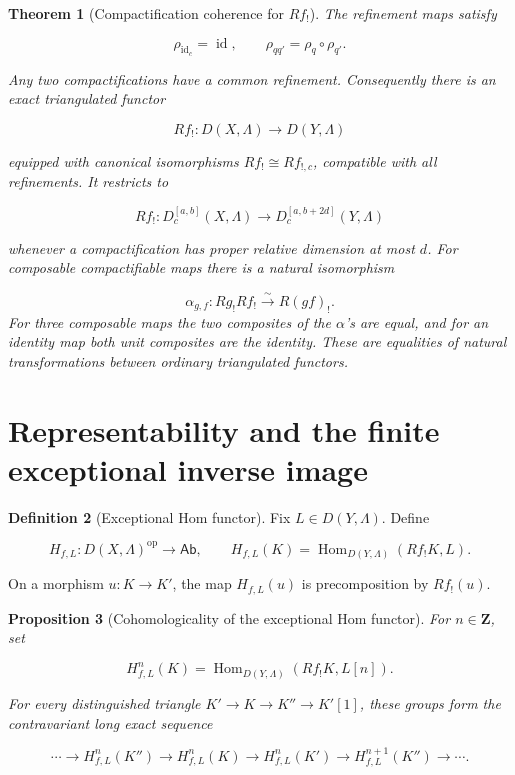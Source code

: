 \documentclass[10pt]{article}
\newtheorem{theorem}{Theorem}[section]
\newtheorem{proposition}[theorem]{Proposition}
\theoremstyle{definition}
\newtheorem{definition}[theorem]{Definition}
\newcommand{\HomD}{\operatorname{Hom}}
\begin{document}
\begin{theorem}[Compactification coherence for \(Rf_!\)]
The refinement maps satisfy

\[
 \rho_{\operatorname{id}_c}=\operatorname{id},
 \qquad \rho_{q q'}=\rho_q\circ\rho_{q'}.
\]

Any two compactifications have a common refinement.  Consequently there is
an exact triangulated functor

\[
 Rf_!:D(X,\Lambda)\longrightarrow D(Y,\Lambda)
\]

equipped with canonical isomorphisms \(Rf_!\cong Rf_{!,c}\), compatible with
all refinements.  It restricts to

\[
 Rf_!:D^{[a,b]}_c(X,\Lambda)\longrightarrow
 D^{[a,b+2d]}_c(Y,\Lambda)
\]

whenever a compactification has proper relative dimension at most \(d\).
For composable compactifiable maps there is a natural isomorphism

\[
 \alpha_{g,f}:Rg_!Rf_!\xrightarrow{\sim}R(gf)_!.
\]
For three composable maps the two composites of the \(\alpha\)'s are equal,
and for an identity map both unit composites are the identity.  These are
equalities of natural transformations between ordinary triangulated
functors.
\end{theorem}

\section{Representability and the finite exceptional inverse image}

\begin{definition}[Exceptional Hom functor]
Fix \(L\in D(Y,\Lambda)\).  Define

\[
 H_{f,L}:D(X,\Lambda)^{\mathrm{op}}\longrightarrow\mathsf{Ab},
 \qquad
 H_{f,L}(K)=\HomD_{D(Y,\Lambda)}(Rf_!K,L).
\]

On a morphism \(u:K\to K'\), the map \(H_{f,L}(u)\) is precomposition by
\(Rf_!(u)\).
\end{definition}

\begin{proposition}[Cohomologicality of the exceptional Hom functor]
For \(n\in\mathbf Z\), set

\[
 H^n_{f,L}(K)=
 \operatorname{Hom}_{D(Y,\Lambda)}(Rf_!K,L[n]).
\]

For every distinguished triangle
\(K'\to K\to K''\to K'[1]\), these groups form the contravariant long
exact sequence

\[
 \cdots\longrightarrow H^n_{f,L}(K'')
 \longrightarrow H^n_{f,L}(K)
 \longrightarrow H^n_{f,L}(K')
 \longrightarrow H^{n+1}_{f,L}(K'')
 \longrightarrow\cdots .
\]
\end{proposition}
\end{document}
